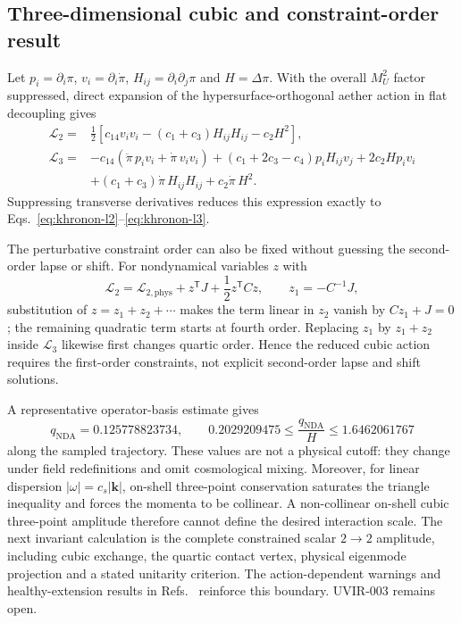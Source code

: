 \subsection{Three-dimensional cubic and constraint-order result}

Let $p_i=\partial_i\pi$, $v_i=\partial_i\dot\pi$,
$H_{ij}=\partial_i\partial_j\pi$ and $H=\Delta\pi$.  With the overall
$M_U^2$ factor suppressed, direct expansion of the hypersurface-orthogonal
aether action in flat decoupling gives
\begin{align}
 \mathcal L_2={}&\frac12\left[
 c_{14}v_iv_i-(c_1+c_3)H_{ij}H_{ij}-c_2H^2\right],
 \label{eq:khronon-3d-l2}\\
 \mathcal L_3={}&-c_{14}\left(\ddot\pi\,p_iv_i+\dot\pi\,v_iv_i\right)
 +(c_1+2c_3-c_4)p_iH_{ij}v_j
 +2c_2Hp_iv_i\nonumber\\
 &+(c_1+c_3)\dot\pi\,H_{ij}H_{ij}
 +c_2\dot\pi\,H^2 .
 \label{eq:khronon-3d-l3}
\end{align}
Suppressing transverse derivatives reduces this expression exactly to
Eqs.~\eqref{eq:khronon-l2}--\eqref{eq:khronon-l3}.

The perturbative constraint order can also be fixed without guessing the
second-order lapse or shift.  For nondynamical variables $z$ with
\begin{equation}
 \mathcal L_2=\mathcal L_{2,\mathrm{phys}}+z^{\mathsf T}J
 +\frac12z^{\mathsf T}Cz,\qquad z_1=-C^{-1}J,
 \label{eq:cubic-constraint-order}
\end{equation}
substitution of $z=z_1+z_2+\cdots$ makes the term linear in $z_2$ vanish by
$Cz_1+J=0$; the remaining quadratic term starts at fourth order.  Replacing
$z_1$ by $z_1+z_2$ inside $\mathcal L_3$ likewise first changes quartic
order.  Hence the reduced cubic action requires the first-order constraints,
not explicit second-order lapse and shift solutions.

A representative operator-basis estimate gives
\begin{equation}
 q_{\mathrm{NDA}}=0.125778823734,\qquad
 0.2029209475\leq\frac{q_{\mathrm{NDA}}}{H}\leq1.6462061767
 \label{eq:khronon-basis-nda}
\end{equation}
along the sampled trajectory.  These values are not a physical cutoff: they
change under field
redefinitions and omit cosmological mixing.  Moreover, for linear dispersion
$|\omega|=c_s|\mathbf k|$, on-shell three-point conservation saturates the
triangle inequality and forces the momenta to be collinear.  A non-collinear
on-shell cubic three-point amplitude therefore cannot define the desired
interaction scale.  The next invariant calculation is the complete
constrained scalar $2\!\to\!2$ amplitude, including cubic exchange, the
quartic contact vertex, physical eigenmode projection and a stated unitarity
criterion.  The action-dependent warnings and healthy-extension results in
Refs.~\cite{blas2010,papazoglou2009} reinforce this boundary.  UVIR-003
remains open.

